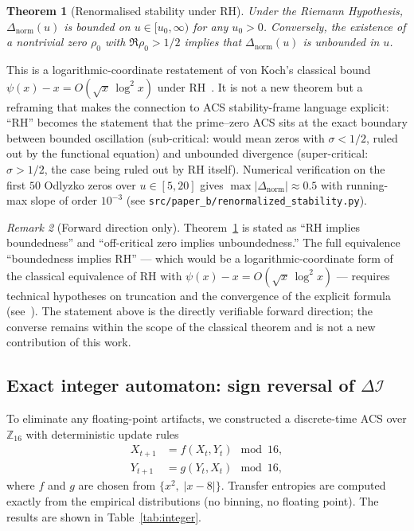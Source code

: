 \documentclass[11pt,a4paper]{article}
\theoremstyle{plain}
\newtheorem{theorem}{Theorem}[section]
\theoremstyle{definition}
\theoremstyle{remark}
\newtheorem{remark}[theorem]{Remark}
\newcommand{\DI}{\Delta\mathcal{I}}
\begin{document}
\begin{theorem}[Renormalised stability under RH]\label{thm:vonKoch-acs}
Under the Riemann Hypothesis, $\Delta_{\mathrm{norm}}(u)$ is bounded
on $u \in [u_0, \infty)$ for any $u_0 > 0$.  Conversely, the existence
of a nontrivial zero $\rho_0$ with $\Re\rho_0 > 1/2$ implies that
$\Delta_{\mathrm{norm}}(u)$ is unbounded in $u$.
\end{theorem}

This is a logarithmic-coordinate restatement of von Koch's classical
bound $\psi(x) - x = O(\sqrt{x}\,\log^2 x)$ under
RH~\cite{vonKoch1901}.  It is not a new theorem but a reframing that
makes the connection to ACS stability-frame language explicit:
``RH'' becomes the statement that the prime--zero ACS sits at the
exact boundary between bounded oscillation (sub-critical: would mean
zeros with $\sigma < 1/2$, ruled out by the functional equation) and
unbounded divergence (super-critical: $\sigma > 1/2$, the case being
ruled out by RH itself).  Numerical verification on the first $50$
Odlyzko zeros over $u \in [5, 20]$ gives $\max|\Delta_{\mathrm{norm}}| \approx 0.5$
with running-max slope of order $10^{-3}$
(see \texttt{src/paper\_b/renormalized\_stability.py}).

\begin{remark}[Forward direction only]
Theorem~\ref{thm:vonKoch-acs} is stated as ``RH implies boundedness''
and ``off-critical zero implies unboundedness.''  The full equivalence
``boundedness implies RH'' --- which would be a logarithmic-coordinate
form of the classical equivalence of RH with $\psi(x) - x = O(\sqrt{x}\,\log^2 x)$ ---
requires technical hypotheses on truncation and the convergence of
the explicit formula (see~\cite{Davenport2000}).  The statement
above is the directly verifiable forward direction; the converse
remains within the scope of the classical theorem and is not a new
contribution of this work.
\end{remark}


\label{sec:comp}
\subsection{Exact integer automaton: sign reversal of $\DI$}

To eliminate any floating-point artifacts, we constructed a discrete-time ACS
over $\mathbb{Z}_{16}$ with deterministic update rules
\begin{align}
  X_{t+1} &= f(X_t, Y_t) \mod 16,\\
  Y_{t+1} &= g(Y_t, X_t) \mod 16,
\end{align}
where $f$ and $g$ are chosen from $\{x^2,\;|x-8|\}$.  Transfer entropies are
computed exactly from the empirical distributions (no binning, no
floating point).  The results are shown in Table~\ref{tab:integer}.
\end{document}
